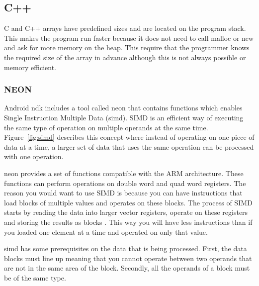 \subsection{C++}
C and C++ arrays have predefined sizes and are located on the program stack. This makes the program run faster because it does not need to call malloc or new and ask for more memory on the heap. This require that the programmer knows the required size of the array in advance although this is not always possible or memory efficient.

\subsubsection{NEON}
Android \gls{ndk} includes a tool called \gls{neon} that contains functions which enables Single Instruction Multiple Data (\gls{simd}). SIMD is an efficient way of executing the same type of operation on multiple operands at the same time. Figure~\ref{fig:simd} describes this concept where instead of operating on one piece of data at a time, a larger set of data that uses the same operation can be processed with one operation.

\gls{neon} provides a set of functions compatible with the ARM architecture. These functions can perform operations on double word and quad word registers. The reason you would want to use SIMD is because you can have instructions that load blocks of multiple values and operates on these blocks.  The process of SIMD starts by reading the data into larger vector registers, operate on these registers and storing the results as blocks \cite{simd:expl}. This way you will have less instructions than if you loaded one element at a time and operated on only that value.

\gls{simd} has some prerequisites on the data that is being processed. First, the data blocks must line up meaning that you cannot operate between two operands that are not in the same area of the block. Secondly, all the operands of a block must be of the same type.

